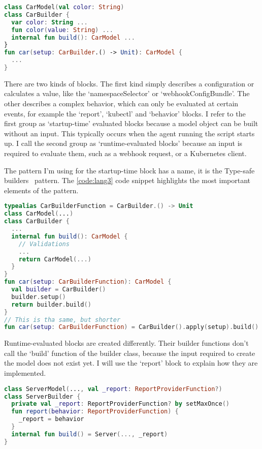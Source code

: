 \begin{lstlisting}[caption={Basic idea behind a block},language=Kotlin,label=code:lang2]
class CarModel(val color: String)
class CarBuilder {
  var color: String ...
  fun color(value: String) ...
  internal fun build(): CarModel ...
}
fun car(setup: CarBuilder.() -> Unit): CarModel {
  ...
}
\end{lstlisting}

There are two kinds of blocks. The first kind simply describes a configuration or calculates a value, like the `namespaceSelector' or `webhookConfigBundle'. The other describes a complex behavior, which can only be evaluated at certain events, for example the `report', `kubectl' and `behavior' blocks. I refer to the first group as `startup-time' evaluated blocks because a model object can be built without an input. This typically occurs when the agent running the script starts up. I call the second group as `runtime-evaluated blocks' because an input is required to evaluate them, such as a webhook request, or a Kubernetes client.

The pattern I'm using for the startup-time block has a name, it is the Type-safe builders~\cite{TypeSafeBuilders} pattern. The \ref{code:lang3} code snippet highlights the most important elements of the pattern.

\begin{lstlisting}[caption={Type-safe builders example},language=Kotlin,label=code:lang3]
typealias CarBuilderFunction = CarBuilder.() -> Unit
class CarModel(...)
class CarBuilder {
  ...
  internal fun build(): CarModel {
    // Validations
    ...
    return CarModel(...)
  }
}
fun car(setup: CarBuilderFunction): CarModel {
  val builder = CarBuilder()
  builder.setup()
  return builder.build()
}
// This is tha same, but shorter
fun car(setup: CarBuilderFunction) = CarBuilder().apply(setup).build()
\end{lstlisting}

Runtime-evaluated blocks are created differently. Their builder functions don't call the `build' function of the builder class, because the input required to create the model does not exist yet. I will use the `report' block to explain how they are implemented.

\begin{lstlisting}[caption={Builder function of the report block},language=Kotlin,label=code:runtimeblock0]
class ServerModel(..., val _report: ReportProviderFunction?)
class ServerBuilder {
  private val _report: ReportProviderFunction? by setMaxOnce()
  fun report(behavior: ReportProviderFunction) {
    _report = behavior
  }
  internal fun build() = Server(..., _report)
}
\end{lstlisting}

